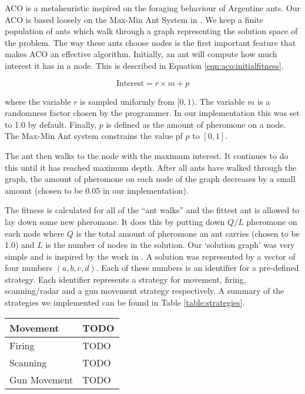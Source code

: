ACO is a metaheuristic inspired on the foraging behaviour of Argentine ants. Our ACO is based loosely on the Max-Min Ant System in \cite{stutzle2000max}. We keep a finite population of ants which walk through a graph representing the solution space of the problem. The way these ants choose nodes is the first important feature that makes ACO an effective algorithm. Initially, an ant will compute how much interest it has in a node. This is described in Equation \ref{eqn:aco:initialfitness}.

\begin{equation}
\label{eqn:aco:initialfitness}
\text{Interest} = r \times m + p
\end{equation}

\noindent where the variable $r$ is sampled uniformly from $[0, 1)$. The variable $m$ is a randomness factor chosen by the programmer. In our implementation this was set to 1.0 by default. Finally, $p$ is defined as the amount of pheromone on a node. The Max-Min Ant system constrains the value pf $p$ to $[0, 1]$. 

The ant then walks to the node with the maximum interest. It continues to do this until it has reached maximum depth. After all ants have walked through the graph, the amount of pheromone on each node of the graph decreases by a small amount (chosen to be 0.05 in our implementation).

The fitness is calculated for all of the ``ant walks'' and the fittest ant is allowed to lay down some new pheromone. It does this by putting down $Q/L$ pheromone on each node where $Q$ is the total amount of pheromone an ant carries (chosen to be 1.0) and $L$ is the number of nodes in the solution. Our `solution graph' was very simple and is inspired by the work in \cite{emergentbehaviours}. A solution was represented by a vector of four numbers $(a, b, c, d)$. Each of these numbers is an identifier for a pre-defined strategy. Each identifier represents a strategy for movement, firing, scanning/radar and a gun movement strategy respectively. A summary of the strategies we implemented can be found in Table \ref{table:strategies}.

\begin{table*}
\centering
\begin{tabular}{|l|l|}
\hline
Movement & TODO \\
\hline
Firing & TODO \\
\hline
Scanning & TODO \\
\hline
Gun Movement & TODO \\
\hline
\end{tabular}
\caption{A Summary of the Strategies Combined in to form the Solution-Space of the Ant Colony Optimization and Genetic Algorithms}
\label{table:strategies}
\end{table*}

